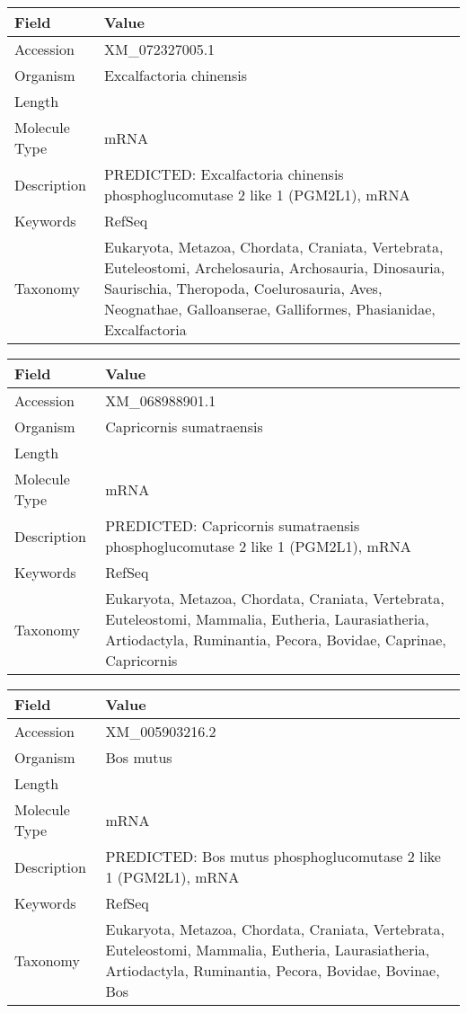 \documentclass[10pt]{article}
\begin{document}
{\footnotesize
\begin{longtable}{>{\raggedright\arraybackslash}p{4.5cm} >{\raggedright\arraybackslash}p{11.5cm}}
\textbf{Field} & \textbf{Value} \\
\hline
Accession & XM\_072327005.1 \\
Organism & Excalfactoria chinensis \\
Length & 5417 \\
Molecule Type & mRNA \\
Description & PREDICTED: Excalfactoria chinensis phosphoglucomutase 2 like 1 (PGM2L1), mRNA \\
Keywords & RefSeq \\
Taxonomy & Eukaryota, Metazoa, Chordata, Craniata, Vertebrata, Euteleostomi, Archelosauria, Archosauria, Dinosauria, Saurischia, Theropoda, Coelurosauria, Aves, Neognathae, Galloanserae, Galliformes, Phasianidae, Excalfactoria \\
\end{longtable}
}

{\footnotesize
\begin{longtable}{>{\raggedright\arraybackslash}p{4.5cm} >{\raggedright\arraybackslash}p{11.5cm}}
\textbf{Field} & \textbf{Value} \\
\hline
Accession & XM\_068988901.1 \\
Organism & Capricornis sumatraensis \\
Length & 1891 \\
Molecule Type & mRNA \\
Description & PREDICTED: Capricornis sumatraensis phosphoglucomutase 2 like 1 (PGM2L1), mRNA \\
Keywords & RefSeq \\
Taxonomy & Eukaryota, Metazoa, Chordata, Craniata, Vertebrata, Euteleostomi, Mammalia, Eutheria, Laurasiatheria, Artiodactyla, Ruminantia, Pecora, Bovidae, Caprinae, Capricornis \\
\end{longtable}
}

{\footnotesize
\begin{longtable}{>{\raggedright\arraybackslash}p{4.5cm} >{\raggedright\arraybackslash}p{11.5cm}}
\textbf{Field} & \textbf{Value} \\
\hline
Accession & XM\_005903216.2 \\
Organism & Bos mutus \\
Length & 7612 \\
Molecule Type & mRNA \\
Description & PREDICTED: Bos mutus phosphoglucomutase 2 like 1 (PGM2L1), mRNA \\
Keywords & RefSeq \\
Taxonomy & Eukaryota, Metazoa, Chordata, Craniata, Vertebrata, Euteleostomi, Mammalia, Eutheria, Laurasiatheria, Artiodactyla, Ruminantia, Pecora, Bovidae, Bovinae, Bos \\
\end{longtable}
}
\end{document}
